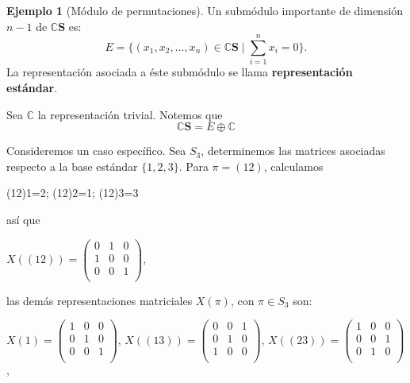 \documentclass[12pt]{book}
\theoremstyle{definition}
\newtheorem{example}[theorem]{Ejemplo}
\newcounter{in}
\begin{document}
\begin{example}[Módulo de permutaciones]
  Un submódulo importante de dimensión $n-1$ de
  $\mathbb{C}\boldsymbol{S}$ es:
  \begin{equation*}
    E=\Big\{(x_{1},x_{2},\ldots,x_{n})\in \mathbb{C}\boldsymbol{S}\mid\sum^{n}_{i=1}x_{i}=0\Big\}.
  \end{equation*}
  La representación asociada a éste submódulo se llama
  \textbf{representación estándar}.
  
  Sea $\mathbb{C}$ la representación trivial. Notemos que
  \begin{equation*}
    \mathbb{C}\boldsymbol{S}=E\oplus \mathbb{C}
  \end{equation*}
  
  Consideremos un caso específico. Sea $S_{3}$, determinemos las
  matrices asociadas respecto a la base estándar $\{1,2,3\}$. Para
  $\pi=(12)$, calculamos
  \begin{center}
    (12)1=2; \qquad (12)2=1; \qquad (12)3=3
  \end{center}
  así que
  \begin{center}
    $X((12))=\begin{pmatrix}
      0 & 1 & 0 \\
      1 & 0 & 0 \\
      0 & 0 & 1 \\
    \end{pmatrix}$,
  \end{center}
  las demás representaciones matriciales $X(\pi)$, con $\pi\in S_{3}$ son:
  \begin{center}
    $X(1)=\begin{pmatrix}
      1 & 0 & 0 \\
      0 & 1 & 0 \\
      0 & 0 & 1 \\
    \end{pmatrix}$,\quad  
    $X((13))=\begin{pmatrix}
      0 & 0 & 1 \\
      0 & 1 & 0 \\
      1 & 0 & 0 \\
    \end{pmatrix}$,\quad 
    $X((23))=\begin{pmatrix}
      1 & 0 & 0 \\
      0 & 0 & 1 \\
      0 & 1 & 0 \\
    \end{pmatrix}$,
  \end{center}
  

\end{example}
\end{document}
